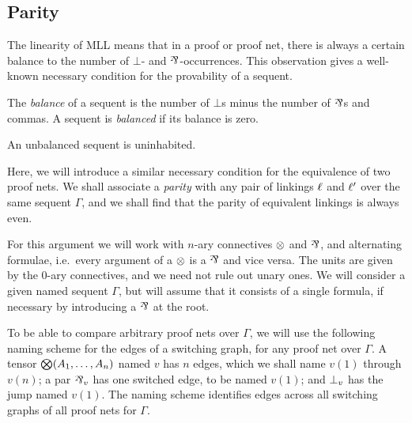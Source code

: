 \documentclass{lmcs}
\let\capsabbrev=\uppercase
\begin{document}




\subsection*{Parity}


The linearity of \capsabbrev{mll} means that in a proof or proof net, there is always a certain balance to the number of $\bot$- and $\pr$-occurrences. This observation gives a well-known necessary condition for the provability of a sequent.

\begin{definition}
The \emph{balance} of a sequent is the number of $\bot$s minus the number of $\pr$s and commas.
%
A sequent is \emph{balanced} if its balance is zero.
\end{definition}

\begin{proposition}
\label{prop:unbalanced then uninhabited}
An unbalanced sequent is uninhabited.
\end{proposition}

Here, we will introduce a similar necessary condition for the equivalence of two proof nets. We shall associate a \emph{parity} with any pair of linkings $\ell$ and $\ell'$ over the same sequent $\Gamma$, and we shall find that the parity of equivalent linkings is always even.

For this argument we will work with $n$-ary connectives $\otimes$ and $\pr$, and alternating formulae, i.e.\ every argument of a $\otimes$ is a $\pr$ and vice versa. The units are given by the $0$-ary connectives, and we need not rule out unary ones. We will consider a given named sequent $\Gamma$, but will assume that it consists of a single formula, if necessary by introducing a $\pr$ at the root.

To be able to compare arbitrary proof nets over $\Gamma$, we will use the following naming scheme for the edges of a switching graph, for any proof net over $\Gamma$. A tensor $\bigotimes(A_1,\dotsc,A_n)$ named $v$ has $n$ edges, which we shall name $v(1)$ through $v(n)$; a par $\named v\pr$ has one switched edge, to be named $v(1)$; and $\bot_{v}$ has the jump named $v(1)$. The naming scheme identifies edges across all switching graphs of all proof nets for $\Gamma$.
\end{document}
